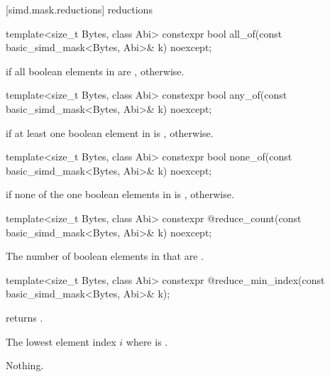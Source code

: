 [simd.mask.reductions]{ reductions}

\begin{itemdecl}
template<size_t Bytes, class Abi> constexpr bool all_of(const basic_simd_mask<Bytes, Abi>& k) noexcept;
\end{itemdecl}

\begin{itemdescr}
  \pnum\returns
   if all boolean elements in  are ,  otherwise.
\end{itemdescr}

\begin{itemdecl}
template<size_t Bytes, class Abi> constexpr bool any_of(const basic_simd_mask<Bytes, Abi>& k) noexcept;
\end{itemdecl}

\begin{itemdescr}
  \pnum\returns
   if at least one boolean element in  is ,  otherwise.
\end{itemdescr}

\begin{itemdecl}
template<size_t Bytes, class Abi> constexpr bool none_of(const basic_simd_mask<Bytes, Abi>& k) noexcept;
\end{itemdecl}

\begin{itemdescr}
  \pnum\returns
   if none of the one boolean elements in  is ,  otherwise.
\end{itemdescr}

\begin{itemdecl}
template<size_t Bytes, class Abi> constexpr @\simdsizetype@ reduce_count(const basic_simd_mask<Bytes, Abi>& k) noexcept;
\end{itemdecl}

\begin{itemdescr}
  \pnum\returns
  The number of boolean elements in  that are .
\end{itemdescr}

\begin{itemdecl}
template<size_t Bytes, class Abi> constexpr @\simdsizetype@ reduce_min_index(const basic_simd_mask<Bytes, Abi>& k);
\end{itemdecl}

\begin{itemdescr}
  \pnum\expects
   returns .

  \pnum\returns
  The lowest element index $i$ where  is .

  \pnum\throws Nothing.
\end{itemdescr}

